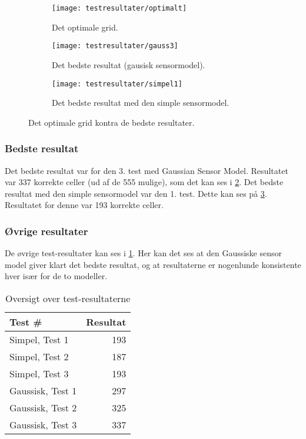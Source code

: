 \begin{figure}[h]
\begin{subfigure}[t]{.48\textwidth}
\texttt{[image: testresultater/optimalt]}
\caption{Det optimale grid.}
\label{evaluering:optimaltgrid}
\end{subfigure}
\hfill
\begin{subfigure}[t]{.48\textwidth}
\texttt{[image: testresultater/gauss3]}
\caption{Det bedste resultat (gausisk sensormodel).}
\label{evaluering:gauss3}
\end{subfigure}
\centering
\begin{subfigure}[b]{.48\textwidth}
\vspace{0.5em}
\texttt{[image: testresultater/simpel1]}
\caption{Det bedste resultat med den simple sensormodel.}
\label{evaluering:simpel1}
\end{subfigure}
\caption{Det optimale grid kontra de bedste resultater.}
\label{evaluering:optvsbedst}
\end{figure}




\subsubsection*{Bedste resultat}
Det bedste resultat var for den 3. test med Gaussian Sensor Model.
Resultatet var 337 korrekte celler (ud af de 555 mulige), som det kan ses i \cref{evaluering:gauss3}. 
Det  bedste resultat med den simple sensormodel var den 1. test. 
Dette kan ses på \cref{evaluering:simpel1}.
Resultatet for denne var 193 korrekte celler.

\subsubsection*{Øvrige resultater}
De øvrige test-resultater kan ses i \cref{evaluering:testresultater}.
Her kan det ses at den Gaussiske sensor model giver klart det bedste resultat, og at resultaterne er nogenlunde konsistente hver især for de to modeller.

\begin{table}[h]
\centering
\begin{tabular}{|l|r|}
\hline
\textbf{Test \#} & \textbf{Resultat} \\ \hline \hline
Simpel, Test 1 & 193 \\ \hline
Simpel, Test 2 & 187 \\ \hline
Simpel, Test 3 & 193 \\ \hline \hline
Gaussisk, Test 1 & 297 \\ \hline
Gaussisk, Test 2 & 325 \\ \hline
Gaussisk, Test 3 & 337 \\ \hline
\end{tabular}
\caption{Oversigt over test-resultaterne}
\label{evaluering:testresultater}
\end{table}

